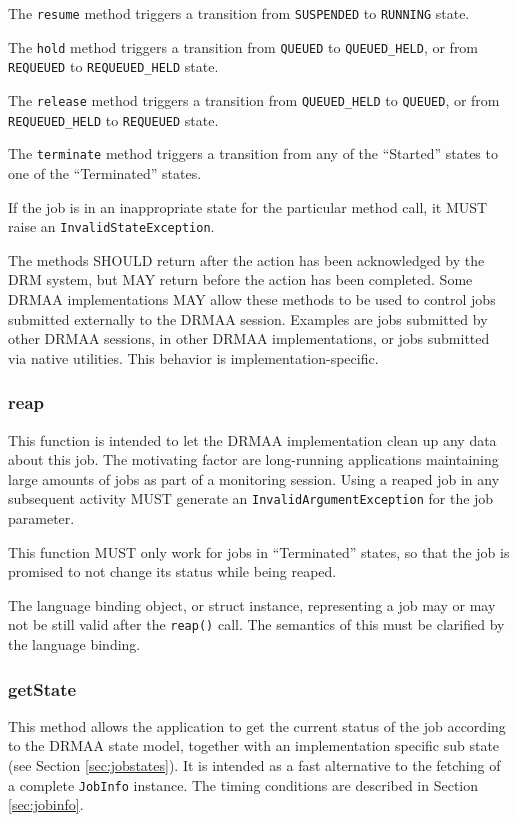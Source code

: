 \documentclass{article}
\newcommand{\h}[1]{\lstinline|#1|}
\newcommand{\langbind}[1]{\begin{shaded}#1\end{shaded}}
\begin{document}
The \h{resume} method triggers a transition from \h{SUSPENDED} to \h{RUNNING} state.

The \h{hold} method triggers a transition from \h{QUEUED} to \h{QUEUED_HELD}, or from \h{REQUEUED} to \h{REQUEUED_HELD} state.

The \h{release} method triggers a transition from \h{QUEUED_HELD} to \h{QUEUED}, or from \h{REQUEUED_HELD} to \h{REQUEUED} state.

The \h{terminate} method triggers a transition from any of the \enquote{Started} states to one of the \enquote{Terminated} states.

If the job is in an inappropriate state for the particular method call, it MUST raise an \h{InvalidStateException}.

The methods SHOULD return after the action has been acknowledged by the DRM system, but MAY return before the action has been completed. Some DRMAA implementations MAY allow these methods to be used to control jobs submitted externally to the DRMAA session. Examples are jobs submitted by other DRMAA sessions, in other DRMAA implementations, or jobs submitted via native utilities. This behavior is implementation-specific.

\subsubsection{reap}
\label{sec:reapjob}

This function is intended to let the DRMAA implementation clean up any data about this job. The motivating factor are long-running applications maintaining large amounts of jobs as part of a monitoring session. Using a reaped job in any subsequent activity MUST generate an \h{InvalidArgumentException} for the job parameter.

This function MUST only work for jobs in \enquote{Terminated} states, so that the job is promised to not change its status while being reaped.

\langbind{
The language binding object, or struct instance, representing a job may or may not be still valid after the \h{reap()} call. The semantics of this must be clarified by the language binding.
}

\subsubsection{getState}

This method allows the application to get the current status of the job according to the DRMAA state model, together with an implementation specific sub state (see Section \ref{sec:jobstates}). It is intended as a fast alternative to the fetching of a complete \h{JobInfo} instance. The timing conditions are described in Section \ref{sec:jobinfo}.
\end{document}
